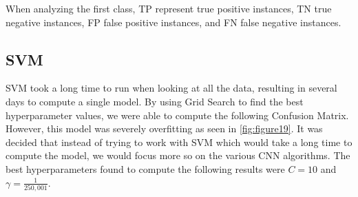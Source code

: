 When analyzing the first class, TP represent true positive instances, TN true negative instances, FP false positive instances, and FN false negative instances.

\subsection{SVM}

SVM took a long time to run when looking at all the data, resulting in several days to compute a single model.
By using Grid Search to find the best hyperparameter values, we were able to compute the following Confusion Matrix.
However, this model was severely overfitting as seen in \ref{fig:figure19}.
It was decided that instead of trying to work with SVM which would take a long time to compute the model, we would focus more so on the various CNN algorithms.
The best hyperparameters found to compute the following results were $C = 10$ and $\gamma = \frac{1}{250,001}$.

